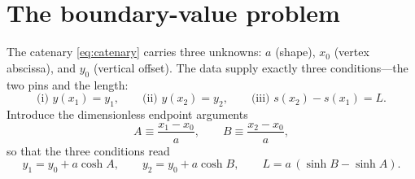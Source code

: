 \documentclass[11pt]{article}
\theoremstyle{remark}
\begin{document}
\section{The boundary-value problem}
The catenary \eqref{eq:catenary} carries three unknowns: $a$ (shape), $x_0$ (vertex
abscissa), and $y_0$ (vertical offset). The data supply exactly three conditions---the two
pins and the length:
\begin{equation}
  \text{(i) } y(x_1)=y_1,\qquad
  \text{(ii) } y(x_2)=y_2,\qquad
  \text{(iii) } s(x_2)-s(x_1)=L.
\end{equation}
Introduce the dimensionless endpoint arguments
\begin{equation}
  A\equiv\frac{x_1-x_0}{a},\qquad B\equiv\frac{x_2-x_0}{a},
\end{equation}
so that the three conditions read
\begin{equation}
  y_1 = y_0+a\cosh A,\qquad
  y_2 = y_0+a\cosh B,\qquad
  L = a\,(\sinh B-\sinh A).
\end{equation}

\end{document}
